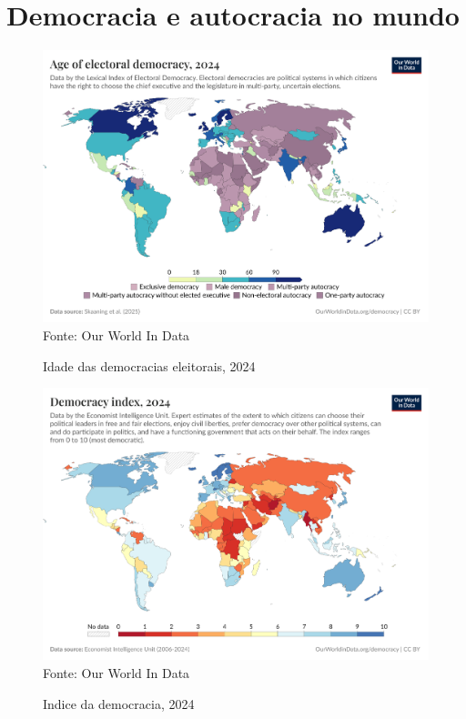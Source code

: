 \section{Democracia e autocracia no mundo}

\begin{figure}[ht]
    \centering
    \caption{Idade das democracias eleitorais, 2024}
    \includegraphics[width=1\linewidth]{figuras/democracia/age-of-electoral-democracy-lexical.png}
    \label{fig:age-of-electoral-democracy-lexical}
    \footnotesize{Fonte: Our World In Data}
\end{figure}

\begin{figure}[ht]
    \centering
    \caption{Indice da democracia, 2024}
    \includegraphics[width=1\linewidth]{figuras/democracia/democracy-index-eiu.png}
    \label{fig:democracy-index-eiu}
    \footnotesize{Fonte: Our World In Data}
\end{figure}

